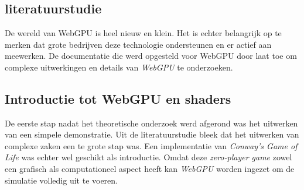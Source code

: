 
\chapter{}%
\label{ch:methodologie}


\section{literatuurstudie}

De wereld van WebGPU is heel nieuw en klein. Het is echter belangrijk op te merken dat grote bedrijven deze technologie ondersteunen en er actief aan meewerken. De documentatie die werd opgesteld voor WebGPU door \textcite{W3C2023} laat toe om complexe uitwerkingen en details van \textit{WebGPU} te onderzoeken.

\section{Introductie tot WebGPU en shaders}

De eerste stap nadat het theoretische onderzoek werd afgerond was het uitwerken van een simpele demonstratie. Uit de literatuurstudie bleek dat het uitwerken van complexe zaken een te grote stap was. Een implementatie van \textit{Conway's Game of Life} was echter wel geschikt als introductie. Omdat deze 
\textit{zero-player game} zowel een grafisch als computationeel aspect heeft kan \textit{WebGPU} worden ingezet om de simulatie volledig uit te voeren. \autocite{google2023}

